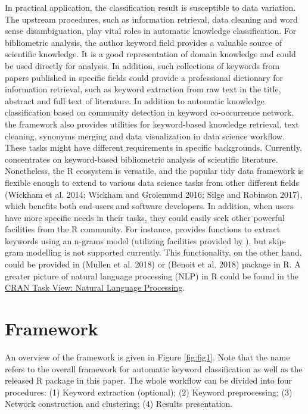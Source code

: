 In practical application, the classification result is susceptible to data variation. The upstream procedures, such as information retrieval, data cleaning and word sense disambiguation, play vital roles in automatic knowledge classification. For bibliometric analysis, the author keyword field provides a valuable source of scientific knowledge. It is a good representation of domain knowledge and could be used directly for analysis. In addition, such collections of keywords from papers published in specific fields could provide a professional dictionary for information retrieval, such as keyword extraction from raw text in the title, abstract and full text of literature. In addition to automatic knowledge classification based on community detection in keyword co-occurrence network, the  framework also provides utilities for keyword-based knowledge retrieval, text cleaning, synonyms merging and data visualization in data science workflow. These tasks might have different requirements in specific backgrounds. Currently,  concentrates on keyword-based bibliometric analysis of scientific literature. Nonetheless, the R ecosystem is versatile, and the popular tidy data framework is flexible enough to extend to various data science tasks from other different fields (Wickham et al. 2014; Wickham and Grolemund 2016; Silge and Robinson 2017), which benefits both end-users and software developers. In addition, when users have more specific needs in their tasks, they could easily seek other powerful facilities from the R community. For instance,  provides functions to extract keywords using an n-grams model (utilizing facilities provided by ), but skip-gram modelling is not supported currently. This functionality, on the other hand, could be provided in  (Mullen et al. 2018) or  (Benoit et al. 2018) package in R. A greater picture of natural language processing (NLP) in R could be found in the \href{https://cran.r-project.org/web/views/NaturalLanguageProcessing.html}{CRAN Task View: Natural Language Processing}.

\hypertarget{framework}{%
\section{Framework}\label{framework}}

An overview of the framework is given in Figure \ref{fig:fig1}. Note that the name  refers to the overall framework for automatic keyword classification as well as the released R package in this paper. The whole workflow can be divided into four procedures: (1) Keyword extraction (optional); (2) Keyword preprocessing; (3) Network construction and clustering; (4) Results presentation.

